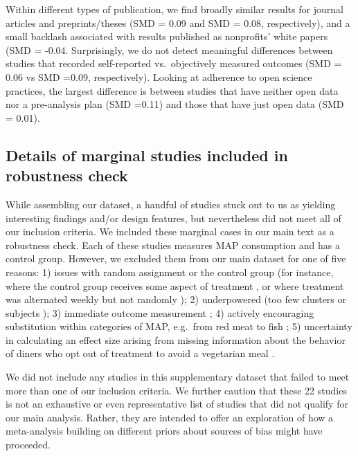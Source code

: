 \documentclass[sn-nature,referee,pdflatex]{sn-jnl}
\begin{document}
Within different types of publication, we find broadly similar results
for journal articles and preprints/theses (SMD = 0.09 and SMD = 0.08,
respectively), and a small backlash associated with results published as
nonprofits' white papers (SMD = -0.04. Surprisingly, we do not detect
meaningful differences between studies that recorded self-reported
vs.~objectively measured outcomes (SMD = 0.06 vs SMD =0.09,
respectively). Looking at adherence to open science practices, the
largest difference is between studies that have neither open data nor a
pre-analysis plan (SMD =0.11) and those that have just open data (SMD =
0.01).

\subsection{Details of marginal studies included in robustness
check}\label{details-of-marginal-studies-included-in-robustness-check}

While assembling our dataset, a handful of studies stuck out to us as
yielding interesting findings and/or design features, but nevertheless
did not meet all of our inclusion criteria. We included these marginal
cases in our main text as a robustness check. Each of these studies
measures MAP consumption and has a control group. However, we excluded
them from our main dataset for one of five reasons: 1) issues with
random assignment or the control group (for instance, where the control
group receives some aspect of treatment \citep{piazza2022}, or where
treatment was alternated weekly but not randomly \citep{garnett2020});
2) underpowered (too few clusters \citep{reinders2017} or subjects
\citep{lentz2019}); 3) immediate outcome measurement
\citep{dannenberg2023, sparkman2017, griesoph2021, hansen2021}; 4)
actively encouraging substitution within categories of MAP, e.g.~from
red meat to fish \citep{celis2017, johansen2009}; 5) uncertainty in
calculating an effect size arising from missing information about the
behavior of diners who opt out of treatment to avoid a vegetarian meal
\citep{betterfoodfoundation2023}.

We did not include any studies in this supplementary dataset that failed
to meet more than one of our inclusion criteria. We further caution that
these 22 studies is not an exhaustive or even representative list of
studies that did not qualify for our main analysis. Rather, they are
intended to offer an exploration of how a meta-analysis building on
different priors about sources of bias might have proceeded.
\end{document}
